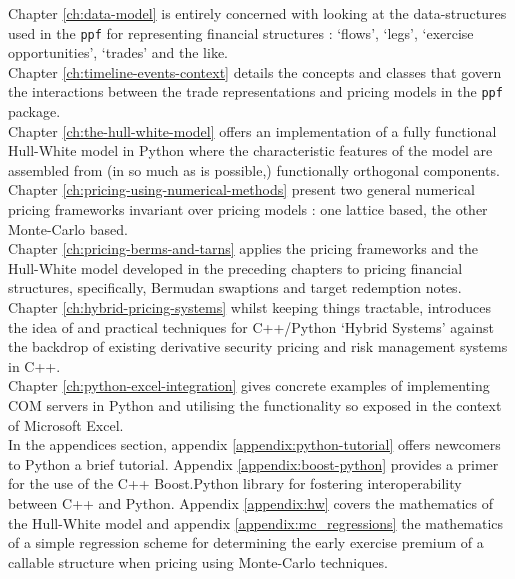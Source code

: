 Chapter \ref{ch:data-model} is entirely concerned with looking at the
data-structures used in the \verb|ppf| for representing financial
structures : `flows', `legs', `exercise opportunities',
`trades' and the like.\\

Chapter \ref{ch:timeline-events-context} details the concepts and
classes that govern the interactions between the trade representations
and pricing models in the \verb|ppf| package.\\

Chapter \ref{ch:the-hull-white-model} offers an implementation of a
fully functional Hull-White model in Python where the characteristic
features of the model are assembled from (in so much as is possible,)
functionally orthogonal components.\\

Chapter \ref{ch:pricing-using-numerical-methods} present two general
numerical pricing frameworks invariant over pricing models : one
lattice based, the other Monte-Carlo based.\\

Chapter \ref{ch:pricing-berms-and-tarns} applies the pricing
frameworks and the Hull-White model developed in the preceding
chapters to pricing financial structures, specifically, Bermudan
swaptions and target redemption notes.\\

Chapter \ref{ch:hybrid-pricing-systems} whilst keeping things
tractable, introduces the idea of and practical techniques for
C++/Python `Hybrid Systems' against the backdrop of existing
derivative security pricing and risk management systems in C++.\\

Chapter \ref{ch:python-excel-integration} gives concrete examples of
implementing COM servers in Python and utilising the functionality so
exposed in the context of Microsoft Excel.\\

In the appendices section, appendix \ref{appendix:python-tutorial}
offers newcomers to Python a brief tutorial. Appendix
\ref{appendix:boost-python} provides a primer for the use of the C++
Boost.Python library for fostering interoperability between C++ and
Python. Appendix \ref{appendix:hw} covers the mathematics of the
Hull-White model and appendix \ref{appendix:mc_regressions} the
mathematics of a simple regression scheme for determining the early
exercise premium of a callable structure when pricing using
Monte-Carlo techniques.
